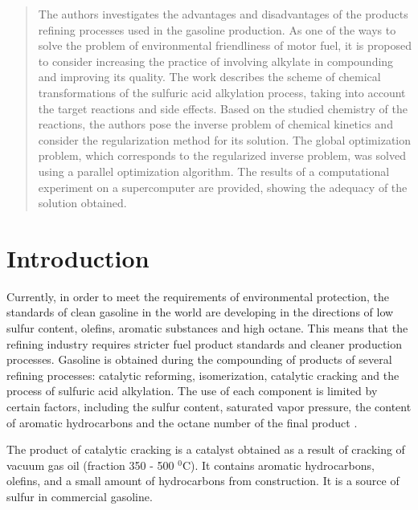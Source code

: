 \documentclass{svproc}
\begin{document}
\begin{abstract}
The authors investigates the advantages and disadvantages of the products refining processes used in the gasoline production. As one of the ways to solve the problem of environmental friendliness of motor fuel, it is proposed to consider increasing the practice of involving alkylate in compounding and improving its quality. The work describes the scheme of chemical transformations of the sulfuric acid alkylation process, taking into account the target reactions and side effects. Based on the studied chemistry of the reactions, the authors pose the inverse problem of chemical kinetics and consider the regularization method for its solution. 
The global optimization problem, which corresponds to the regularized inverse problem, was solved using a parallel optimization algorithm.
The results of a computational experiment on a supercomputer are provided, showing the adequacy of the solution obtained.

\end{abstract}
%
\section{Introduction}
%
Currently, in order to meet the requirements of environmental protection, the standards of clean gasoline in the world are developing in the directions of low sulfur content, olefins, aromatic substances and high octane. This means that the refining industry requires stricter fuel product standards and cleaner production processes. Gasoline is obtained during the compounding of products of several refining processes: catalytic reforming, isomerization, catalytic cracking and the process of sulfuric acid alkylation. The use of each component is limited by certain factors, including the sulfur content, saturated vapor pressure, the content of aromatic hydrocarbons and the octane number of the final product \cite{alkylation_mod}.

The product of catalytic cracking is a catalyst obtained as a result of cracking of vacuum gas oil (fraction 350 - 500 $^0$C). It contains aromatic hydrocarbons, olefins, and a small amount of hydrocarbons from construction. It is a source of sulfur in commercial gasoline.
\end{document}

